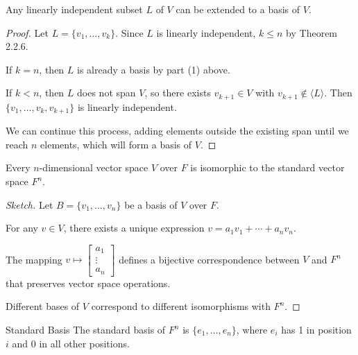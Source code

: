 \documentclass[a4paper, 9pt]{extarticle}
\begin{document}
\begin{theorembox}
  Any linearly independent subset $L$ of $V$ can be extended to a basis of $V$.
\end{theorembox}

\begin{proof}
  Let $L = \{v_1, \ldots, v_k\}$. Since $L$ is linearly independent, $k \leq n$ by Theorem 2.2.6.

  If $k = n$, then $L$ is already a basis by part (1) above.

  If $k < n$, then $L$ does not span $V$, so there exists $v_{k+1} \in V$ with $v_{k+1} \notin \langle L \rangle$. Then $\{v_1, \ldots, v_k, v_{k+1}\}$ is linearly independent.

  We can continue this process, adding elements outside the existing span until we reach $n$ elements, which will form a basis of $V$.
\end{proof}

\begin{theorembox}
  Every $n$-dimensional vector space $V$ over $F$ is isomorphic to the standard vector space $F^n$.
\end{theorembox}

\begin{proof}[Sketch]
  Let $B = \{v_1, \ldots, v_n\}$ be a basis of $V$ over $F$.

  For any $v \in V$, there exists a unique expression $v = a_1v_1 + \cdots + a_nv_n$.

  The mapping $v \mapsto \begin{bmatrix} a_1 \\ \vdots \\ a_n \end{bmatrix}$ defines a bijective correspondence between $V$ and $F^n$ that preserves vector space operations.

  Different bases of $V$ correspond to different isomorphisms with $F^n$.
\end{proof}

\begin{definitionbox}{Standard Basis}{}
  The standard basis of $F^n$ is $\{e_1, \ldots, e_n\}$, where $e_i$ has 1 in position $i$ and 0 in all other positions.
\end{definitionbox}
\end{document}
